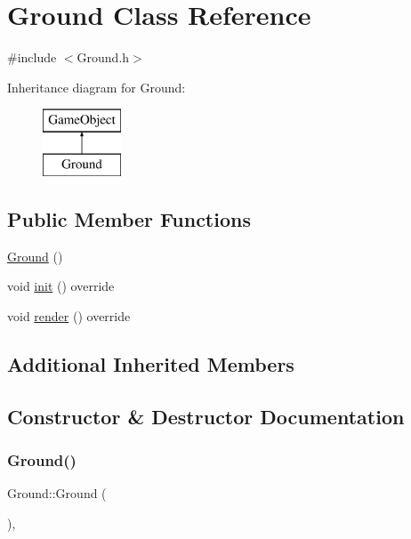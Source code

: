 \hypertarget{class_ground}{}\section{Ground Class Reference}
\label{class_ground}


{\ttfamily \#include $<$Ground.\+h$>$}

Inheritance diagram for Ground\+:\begin{figure}[H]
\begin{center}
\leavevmode
\includegraphics[height=2.000000cm]{class_ground}
\end{center}
\end{figure}
\subsection*{Public Member Functions}
\begin{DoxyCompactItemize}
\item 
\hyperlink{class_ground_abe733811bf44d4791c7811a5f71aae25}{Ground} ()
\item 
void \hyperlink{class_ground_a4680c2a6ab91627a71939a5a942409ac}{init} () override
\item 
void \hyperlink{class_ground_a558a7774ca17a4fb4455a0e0d9f66a94}{render} () override
\end{DoxyCompactItemize}
\subsection*{Additional Inherited Members}


\subsection{Constructor \& Destructor Documentation}
\mbox{\label{class_ground_abe733811bf44d4791c7811a5f71aae25}} 
\subsubsection{\texorpdfstring{Ground()}{Ground()}}
{\footnotesize\ttfamily Ground\+::\+Ground (\begin{DoxyParamCaption}{ }\end{DoxyParamCaption})\hspace{0.3cm}{\ttfamily [inline]}, {\ttfamily [explicit]}}



